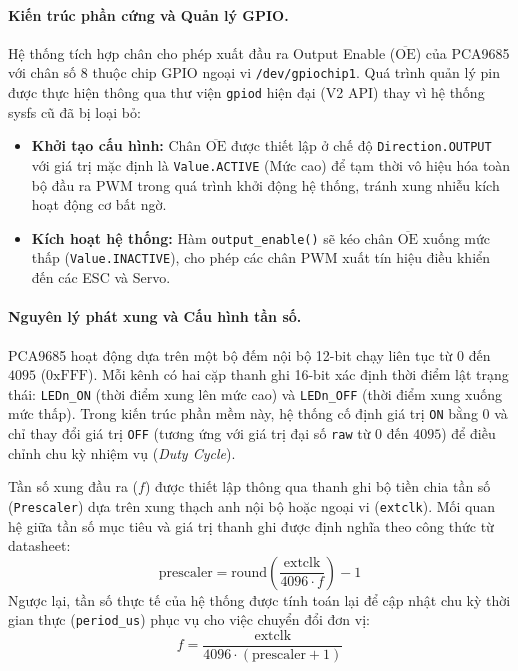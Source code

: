 \documentclass[../DoAn.tex]{subfiles}
\begin{document}
\paragraph{Kiến trúc phần cứng và Quản lý GPIO.}

Hệ thống tích hợp chân cho phép xuất đầu ra Output Enable ($\overline{\text{OE}}$) của PCA9685 với chân số 8 thuộc chip GPIO ngoại vi \texttt{/dev/gpiochip1}. Quá trình quản lý pin được thực hiện thông qua thư viện \texttt{gpiod} hiện đại (V2 API) thay vì hệ thống sysfs cũ đã bị loại bỏ:
\begin{itemize}
    \item \textbf{Khởi tạo cấu hình:} Chân $\overline{\text{OE}}$ được thiết lập ở chế độ \texttt{Direction.OUTPUT} với giá trị mặc định là \texttt{Value.ACTIVE} (Mức cao) để tạm thời vô hiệu hóa toàn bộ đầu ra PWM trong quá trình khởi động hệ thống, tránh xung nhiễu kích hoạt động cơ bất ngờ.
    \item \textbf{Kích hoạt hệ thống:} Hàm \texttt{output\_enable()} sẽ kéo chân $\overline{\text{OE}}$ xuống mức thấp (\texttt{Value.INACTIVE}), cho phép các chân PWM xuất tín hiệu điều khiển đến các ESC và Servo.
\end{itemize}

\paragraph{Nguyên lý phát xung và Cấu hình tần số.}

PCA9685 hoạt động dựa trên một bộ đếm nội bộ 12-bit chạy liên tục từ $0$ đến $4095$ ($0\text{xFFF}$). Mỗi kênh có hai cặp thanh ghi 16-bit xác định thời điểm lật trạng thái: \texttt{LEDn\_ON} (thời điểm xung lên mức cao) và \texttt{LEDn\_OFF} (thời điểm xung xuống mức thấp). Trong kiến trúc phần mềm này, hệ thống cố định giá trị \texttt{ON} bằng $0$ và chỉ thay đổi giá trị \texttt{OFF} (tương ứng với giá trị đại số \texttt{raw} từ $0$ đến $4095$) để điều chỉnh chu kỳ nhiệm vụ (\textit{Duty Cycle}).

Tần số xung đầu ra ($f$) được thiết lập thông qua thanh ghi bộ tiền chia tần số (\texttt{Prescaler}) dựa trên xung thạch anh nội bộ hoặc ngoại vi (\texttt{extclk}). Mối quan hệ giữa tần số mục tiêu và giá trị thanh ghi được định nghĩa theo công thức từ datasheet:
\begin{equation}
    \text{prescaler} = \text{round}\left( \frac{\text{extclk}}{4096 \cdot f} \right) - 1
\end{equation}
Ngược lại, tần số thực tế của hệ thống được tính toán lại để cập nhật chu kỳ thời gian thực (\texttt{period\_us}) phục vụ cho việc chuyển đổi đơn vị:
\begin{equation}
    f = \frac{\text{extclk}}{4096 \cdot (\text{prescaler} + 1)}
\end{equation}
\end{document}
